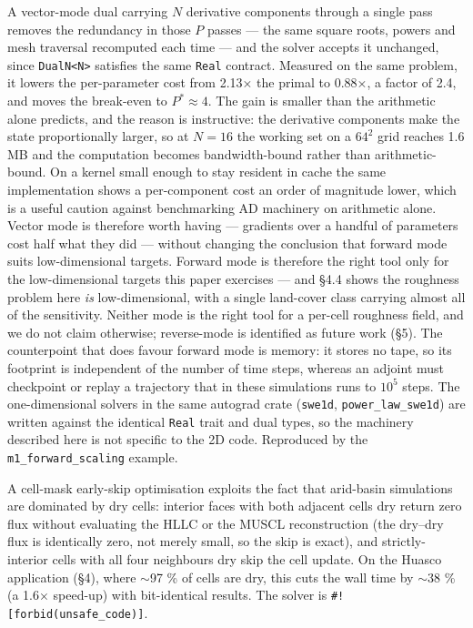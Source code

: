 A vector-mode dual carrying \(N\) derivative components through a single
pass removes the redundancy in those \(P\) passes --- the same square
roots, powers and mesh traversal recomputed each time --- and the solver
accepts it unchanged, since \texttt{DualN\textless{}N\textgreater{}}
satisfies the same \texttt{Real} contract. Measured on the same problem,
it lowers the per-parameter cost from 2.13× the primal to 0.88×, a
factor of 2.4, and moves the break-even to \(P^{*} \approx 4\). The gain
is smaller than the arithmetic alone predicts, and the reason is
instructive: the derivative components make the state proportionally
larger, so at \(N = 16\) the working set on a \(64^{2}\) grid reaches
1.6 MB and the computation becomes bandwidth-bound rather than
arithmetic-bound. On a kernel small enough to stay resident in cache the
same implementation shows a per-component cost an order of magnitude
lower, which is a useful caution against benchmarking AD machinery on
arithmetic alone. Vector mode is therefore worth having --- gradients
over a handful of parameters cost half what they did --- without
changing the conclusion that forward mode suits low-dimensional targets.
Forward mode is therefore the right tool only for the low-dimensional
targets this paper exercises --- and §4.4 shows the roughness problem
here \emph{is} low-dimensional, with a single land-cover class carrying
almost all of the sensitivity. Neither mode is the right tool for a
per-cell roughness field, and we do not claim otherwise; reverse-mode is
identified as future work (§5). The counterpoint that does favour
forward mode is memory: it stores no tape, so its footprint is
independent of the number of time steps, whereas an adjoint must
checkpoint or replay a trajectory that in these simulations runs to
\(10^{5}\) steps. The one-dimensional solvers in the same autograd crate
(\texttt{swe1d}, \texttt{power\_law\_swe1d}) are written against the
identical \texttt{Real} trait and dual types, so the machinery described
here is not specific to the 2D code. Reproduced by the
\texttt{m1\_forward\_scaling} example.

A cell-mask early-skip optimisation exploits the fact that arid-basin
simulations are dominated by dry cells: interior faces with both
adjacent cells dry return zero flux without evaluating the HLLC or the
MUSCL reconstruction (the dry--dry flux is identically zero, not merely
small, so the skip is exact), and strictly-interior cells with all four
neighbours dry skip the cell update. On the Huasco application (§4),
where $\sim$97 \% of cells are dry, this cuts the wall time by
$\sim$38 \% (a 1.6× speed-up) with bit-identical results. The
solver is \texttt{\#!{[}forbid(unsafe\_code){]}}.

